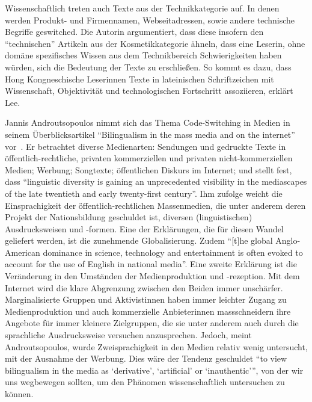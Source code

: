 Wissenschaftlich treten auch Texte aus der Technikkategorie auf.
In denen werden Produkt- und Firmennamen, Webseitadressen, sowie andere technische Begriffe geswitched.
Die Autorin argumentiert, dass diese insofern den ``technischen'' Artikeln aus der Kosmetikkategorie ähneln, dass eine Leserin, ohne domäne spezifisches Wissen aus dem Technikbereich Schwierigkeiten haben würden, sich die Bedeutung der Texte zu erschließen.
So kommt es dazu, dass Hong Kongneschische Leserinnen Texte in lateinischen Schriftzeichen mit Wissenschaft, Objektivität und technologischen Fortschritt assoziieren, erklärt Lee.


Jannis Androutsopoulos nimmt sich das Thema Code-Switching in Medien in seinem Überblicksartikel ``Bilingualism in the mass media and on the internet'' vor~\cite[]{Andr07}.
Er betrachtet diverse Medienarten: Sendungen und gedruckte Texte in öffentlich-rechtliche, privaten kommerziellen und privaten nicht-kommerziellen Medien; Werbung; Songtexte; öffentlichen Diskurs im Internet;
und stellt fest, dass ``linguistic diversity is gaining an unprecedented visibility in the mediascapes of the late twentieth and early twenty-first century''.
Ihm zufolge weicht die Einsprachigkeit der öffentlich-rechtlichen Massenmedien, die unter anderem deren Projekt der Nationsbildung geschuldet ist, diversen (linguistischen) Ausdrucksweisen und -formen.
Eine der Erklärungen, die für diesen Wandel geliefert werden, ist die zunehmende Globalisierung.
Zudem ``[t]he global Anglo-American dominance in science, technology and entertainment is often evoked to account for the use of English in national media''.
Eine zweite Erklärung ist die Veränderung in den Umständen der Medienproduktion und -rezeption.
Mit dem Internet wird die klare Abgrenzung zwischen den Beiden immer unschärfer.
Marginalisierte Gruppen und Aktivistinnen haben immer leichter Zugang zu Medienproduktion und auch kommerzielle Anbieterinnen massschneidern ihre Angebote für immer kleinere Zielgruppen, die sie unter anderem auch durch die sprachliche Ausdrucksweise versuchen anzusprechen.
Jedoch, meint Androutsopoulos, wurde Zweisprachigkeit in den Medien relativ wenig untersucht, mit der Ausnahme der Werbung.
Dies wäre der Tendenz geschuldet ``to view bilingualism in the media as ‘derivative’, ‘artificial’ or ‘inauthentic’'', %
von der wir uns wegbewegen sollten, um den Phänomen wissenschaftlich untersuchen zu können.


